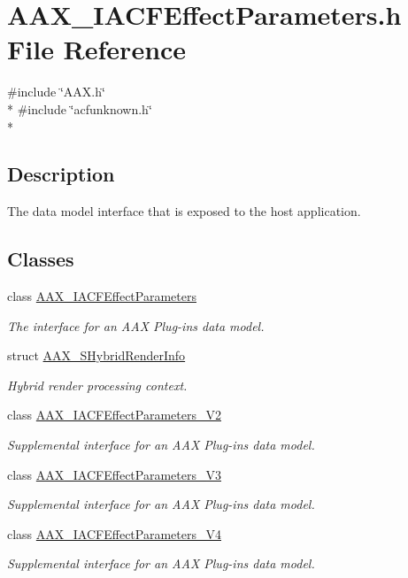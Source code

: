 \hypertarget{a00224}{}\section{A\+A\+X\+\_\+\+I\+A\+C\+F\+Effect\+Parameters.\+h File Reference}
\label{a00224}
{\ttfamily \#include \char`\"{}A\+A\+X.\+h\char`\"{}}\\*
{\ttfamily \#include \char`\"{}acfunknown.\+h\char`\"{}}\\*


\subsection{Description}
The data model interface that is exposed to the host application. 

\subsection*{Classes}
\begin{DoxyCompactItemize}
\item 
class \hyperlink{a00061}{A\+A\+X\+\_\+\+I\+A\+C\+F\+Effect\+Parameters}
\begin{DoxyCompactList}\small\item\em The interface for an A\+A\+X Plug-\/in\textquotesingle{}s data model. \end{DoxyCompactList}\item 
struct \hyperlink{a00121}{A\+A\+X\+\_\+\+S\+Hybrid\+Render\+Info}
\begin{DoxyCompactList}\small\item\em Hybrid render processing context. \end{DoxyCompactList}\item 
class \hyperlink{a00062}{A\+A\+X\+\_\+\+I\+A\+C\+F\+Effect\+Parameters\+\_\+\+V2}
\begin{DoxyCompactList}\small\item\em Supplemental interface for an A\+A\+X Plug-\/in\textquotesingle{}s data model. \end{DoxyCompactList}\item 
class \hyperlink{a00063}{A\+A\+X\+\_\+\+I\+A\+C\+F\+Effect\+Parameters\+\_\+\+V3}
\begin{DoxyCompactList}\small\item\em Supplemental interface for an A\+A\+X Plug-\/in\textquotesingle{}s data model. \end{DoxyCompactList}\item 
class \hyperlink{a00064}{A\+A\+X\+\_\+\+I\+A\+C\+F\+Effect\+Parameters\+\_\+\+V4}
\begin{DoxyCompactList}\small\item\em Supplemental interface for an A\+A\+X Plug-\/in\textquotesingle{}s data model. \end{DoxyCompactList}\end{DoxyCompactItemize}

